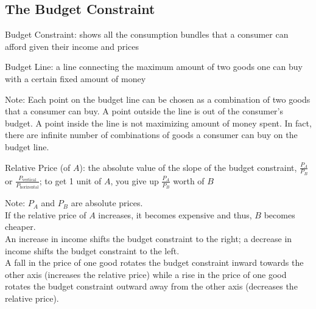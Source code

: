 \documentclass[12pt]{article}
\begin{document}
\subsection{The Budget Constraint} 
\begin{definition} Budget Constraint: shows all the consumption bundles that a consumer can afford given their income and prices \end{definition} 
\begin{definition} Budget Line: a line connecting the maximum amount of two goods one can buy with a certain fixed amount of money \end{definition} 
Note: Each point on the budget line can be chosen as a combination of two goods that a consumer can buy. A point outside the line is out of the consumer's budget. A point inside the line is not maximizing amount of money spent. In fact, there are infinite number of combinations of goods a consumer can buy on the budget line. 
\begin{definition} Relative Price (of $A$): the absolute value of the slope of the budget constraint, $\frac{P_A}{P_B}$ or $\frac{P_{\text{vertical}}}{P_{\text{horizontal}}} $; to get 1 unit of $A$, you give up $\frac{P_A}{P_B}$ worth of $B$  \end{definition} 
Note: $P_A$ and $P_B$ are absolute prices. \\
If the relative price of $A$ increases, it becomes expensive and thus, $B$ becomes cheaper. \\
An increase in income shifts the budget constraint to the right; a decrease in income shifts the budget constraint to the left. \\ A fall in the price of one good rotates the budget constraint inward towards the other axis (increases the relative price) while a rise in the price of one good rotates the budget constraint outward away from the other axis (decreases the relative price). 
\end{document}
